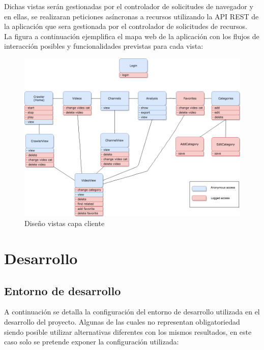 \documentclass[11pt,a4paper]{article}
\begin{document}
Dichas vistas serán gestionadas por el controlador de solicitudes de navegador y en ellas, se realizaran peticiones asíncronas a recursos utilizando la API REST de la aplicación que sera gestionada por el controlador de solicitudes de recursos.
\\

La figura a continuación ejemplifica el mapa web de la aplicación con los flujos de interacción posibles y funcionalidades previstas para cada vista:

\begin{figure}[H]
\centering
\includegraphics[scale=0.40]{diseno/capaCliente.png}
\caption{Diseño vistas capa cliente}
\end{figure}

\newpage 




\section{Desarrollo}
\bigskip

\subsection{Entorno de desarrollo}
A continuación se detalla la configuración del entorno de desarrollo utilizada en el desarrollo del proyecto. Algunas de las cuales no representan obligatoriedad siendo posible utilizar alternativas diferentes con los mismos resultados, en este caso solo se pretende exponer la configuración utilizada:
\end{document}
